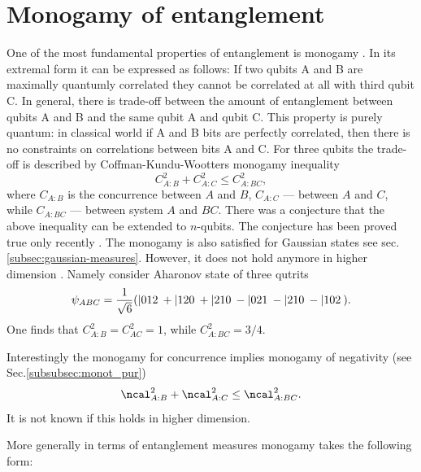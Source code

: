 \documentclass[rmp,12pt,preprint]{revtex4-2}
\begin{document}
\section{Monogamy of entanglement}
\label{sec:monogamy}

One of the most fundamental properties of entanglement is monogamy
\cite{CoffmanKW-tangle,Terhal2000-laa}. In its extremal form it can be
expressed as follows: If two qubits A and B are maximally quantumly
correlated they cannot be correlated at all with third qubit C. In
general, there is trade-off between the amount of entanglement between
qubits A and B and the same qubit A and qubit C. This property is
purely quantum: in classical world if A and B bits are perfectly
correlated, then there is no constraints on correlations between bits
A and C. For three qubits the trade-off is described by Coffman-Kundu-Wootters
monogamy inequality
\begin{equation}
 C^2_{A:B}+ C^2_{A:C}\leq C^2_{A:BC},
\label{CKW}
\end{equation}
where $C_{A:B}$ is the concurrence between $A$ and $B$, $C_{A:C}$ ---
between $A$ and $C$, while $C_{A:BC}$ --- between system $A$ and
$BC$. There was a conjecture that the above inequality can be extended
to $n$-qubits. The conjecture has been proved true only recently
\cite{OsborneV-monogamy}. The monogamy is also satisfied for Gaussian states \cite{HiroshimaAI2007,GTangle_AdeFab}
see sec. \ref{subsec:gaussian-measures}.
However, it does not hold anymore in higher dimension \cite{Ou2006-monogamy-viol}.
Namely consider Aharonov state of three qutrits
\begin{equation}
\psi_{ABC}={1\over \sqrt 6}( |012\> +|120\> + |210\> -
|021\> - |210\> - |102\>).
\end{equation}
One finds that $C^2_{A:B}=C^2_{AC}=1$, while $C^2_{A:BC}=3/4$.

Interestingly the monogamy for concurrence
implies monogamy of negativity  (see Sec.\ref{subsubsec:monot_pur}) \cite {OuF2007}
\begin{equation}
\ncal^2_{A:B}+  \ncal^2_{A:C}\leq  \ncal^2_{A:BC}.
\label{neg}
\end{equation}
It is not known if this holds in higher dimension.

More generally in terms of entanglement measures monogamy takes the
following form:
\end{document}
